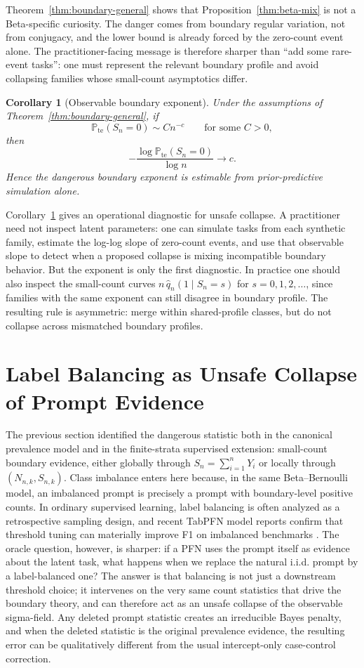 \documentclass{article}
\newtheorem{corollary}[theorem]{Corollary}
\theoremstyle{definition}
\theoremstyle{remark}
\newcommand{\Pbb}{\mathbb{P}}
\newcommand{\te}{\mathrm{te}}
\begin{document}
Theorem~\ref{thm:boundary-general} shows that Proposition~\ref{thm:beta-mix} is not a Beta-specific curiosity. The danger comes from boundary regular variation, not from conjugacy, and the lower bound is already forced by the zero-count event alone. The practitioner-facing message is therefore sharper than ``add some rare-event tasks'': one must represent the relevant boundary profile and avoid collapsing families whose small-count asymptotics differ.

\begin{corollary}[Observable boundary exponent]
\label{cor:observable-exponent}
Under the assumptions of Theorem~\ref{thm:boundary-general}, if
\[
\Pbb_{\te}(S_n=0)\sim C n^{-c}
\qquad\text{for some } C>0,
\]
then
\[
-\frac{\log \Pbb_{\te}(S_n=0)}{\log n}\to c.
\]
Hence the dangerous boundary exponent is estimable from prior-predictive simulation alone.
\end{corollary}

Corollary~\ref{cor:observable-exponent} gives an operational diagnostic for unsafe collapse. A practitioner need not inspect latent parameters: one can simulate tasks from each synthetic family, estimate the log-log slope of zero-count events, and use that observable slope to detect when a proposed collapse is mixing incompatible boundary behavior. But the exponent is only the first diagnostic. In practice one should also inspect the small-count curves $n\,\hat q_n(1\mid S_n=s)$ for $s=0,1,2,\dots$, since families with the same exponent can still disagree in boundary profile. The resulting rule is asymmetric: merge within shared-profile classes, but do not collapse across mismatched boundary profiles.

\section{Label Balancing as Unsafe Collapse of Prompt Evidence}
\label{sec:imbalance}

The previous section identified the dangerous statistic both in the canonical prevalence model and in the finite-strata supervised extension: small-count boundary evidence, either globally through $S_n=\sum_{i=1}^n Y_i$ or locally through $(N_{n,k},S_{n,k})$. Class imbalance enters here because, in the same Beta--Bernoulli model, an imbalanced prompt is precisely a prompt with boundary-level positive counts. In ordinary supervised learning, label balancing is often analyzed as a retrospective sampling design, and recent TabPFN model reports confirm that threshold tuning can materially improve F1 on imbalanced benchmarks \citep[Fig.~17]{grinsztajn2025tabpfn25}. The oracle question, however, is sharper: if a PFN uses the prompt itself as evidence about the latent task, what happens when we replace the natural i.i.d. prompt by a label-balanced one? The answer is that balancing is not just a downstream threshold choice; it intervenes on the very same count statistics that drive the boundary theory, and can therefore act as an unsafe collapse of the observable sigma-field. Any deleted prompt statistic creates an irreducible Bayes penalty, and when the deleted statistic is the original prevalence evidence, the resulting error can be qualitatively different from the usual intercept-only case-control correction.
\end{document}
